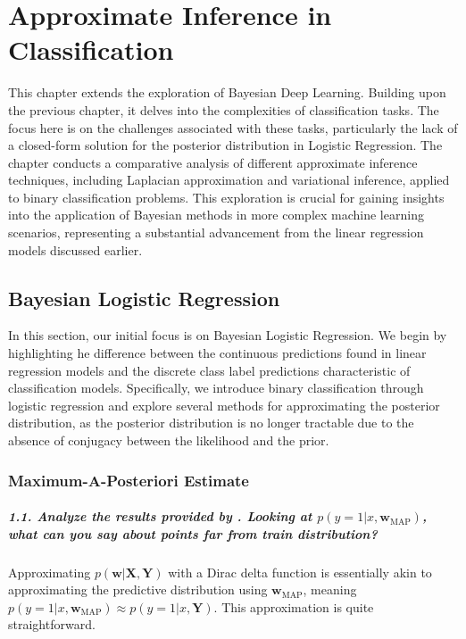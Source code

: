 \graphicspath{{figs/3b}}

\chapter{Approximate Inference in Classification}

This chapter extends the exploration of Bayesian Deep Learning. Building upon the previous chapter, it delves into the complexities of classification tasks. The focus here is on the challenges associated with these tasks, particularly the lack of a closed-form solution for the posterior distribution in Logistic Regression. The chapter conducts a comparative analysis of different approximate inference techniques, including Laplacian approximation and variational inference, applied to binary classification problems. This exploration is crucial for gaining insights into the application of Bayesian methods in more complex machine learning scenarios, representing a substantial advancement from the linear regression models discussed earlier.

\section{Bayesian Logistic Regression}

In this section, our initial focus is on Bayesian Logistic Regression. We begin by highlighting he difference between the continuous predictions found in linear regression models and the discrete class label predictions characteristic of classification models. Specifically, we introduce binary classification through logistic regression and explore several methods for approximating the posterior distribution, as the posterior distribution is no longer tractable due to the absence of conjugacy between the likelihood and the prior. 

\subsection{Maximum-A-Posteriori Estimate}
\paragraph{1.1. Analyze the results provided by . Looking at $p(y=1 | x, \mathbf{w}_{\textrm{MAP}})$, what can you say about points far from train distribution?}

Approximating $p(\mathbf{w} | \mathbf{X}, \mathbf{Y})$ with a Dirac delta function is essentially akin to approximating the predictive distribution using $\mathbf{w}_{\textrm{MAP}}$, meaning $p(y=1 | x, \mathbf{w}_{\textrm{MAP}}) \approx p(y=1 | x, \mathbf{Y})$. This approximation is quite straightforward. 

